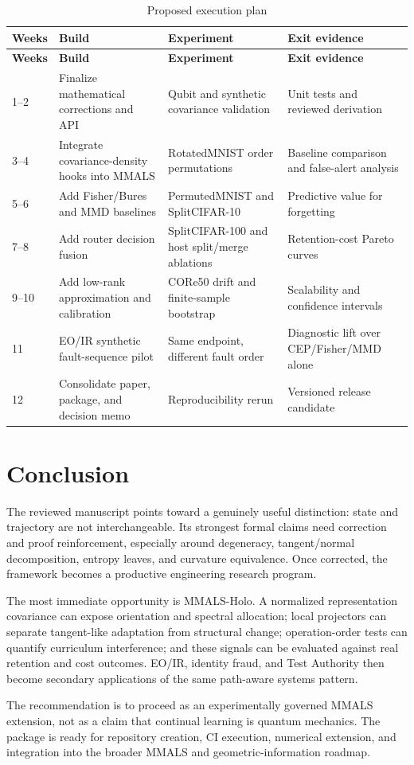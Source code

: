 \begin{longtable}{p{} p{} p{} p{}}
\caption{Proposed execution plan}\label{tab:roadmap}\\
\toprule
\textbf{Weeks} & \textbf{Build} & \textbf{Experiment} & \textbf{Exit evidence} \\
\midrule
\endfirsthead
\toprule
\textbf{Weeks} & \textbf{Build} & \textbf{Experiment} & \textbf{Exit evidence} \\
\midrule
\endhead
1--2 & Finalize mathematical corrections and API & Qubit and synthetic covariance validation & Unit tests and reviewed derivation \\
3--4 & Integrate covariance-density hooks into MMALS & RotatedMNIST order permutations & Baseline comparison and false-alert analysis \\
5--6 & Add Fisher/Bures and MMD baselines & PermutedMNIST and SplitCIFAR-10 & Predictive value for forgetting \\
7--8 & Add router decision fusion & SplitCIFAR-100 and host split/merge ablations & Retention-cost Pareto curves \\
9--10 & Add low-rank approximation and calibration & CORe50 drift and finite-sample bootstrap & Scalability and confidence intervals \\
11 & EO/IR synthetic fault-sequence pilot & Same endpoint, different fault order & Diagnostic lift over CEP/Fisher/MMD alone \\
12 & Consolidate paper, package, and decision memo & Reproducibility rerun & Versioned release candidate \\
\bottomrule
\end{longtable}

\section{Conclusion}

The reviewed manuscript points toward a genuinely useful distinction: state and trajectory are not interchangeable. Its strongest formal claims need correction and proof reinforcement, especially around degeneracy, tangent/normal decomposition, entropy leaves, and curvature equivalence. Once corrected, the framework becomes a productive engineering research program.

The most immediate opportunity is MMALS-Holo. A normalized representation covariance can expose orientation and spectral allocation; local projectors can separate tangent-like adaptation from structural change; operation-order tests can quantify curriculum interference; and these signals can be evaluated against real retention and cost outcomes. EO/IR, identity fraud, and Test Authority then become secondary applications of the same path-aware systems pattern.

\begin{executivebox}
The recommendation is to proceed as an experimentally governed MMALS extension, not as a claim that continual learning is quantum mechanics. The package is ready for repository creation, CI execution, numerical extension, and integration into the broader MMALS and geometric-information roadmap.
\end{executivebox}


